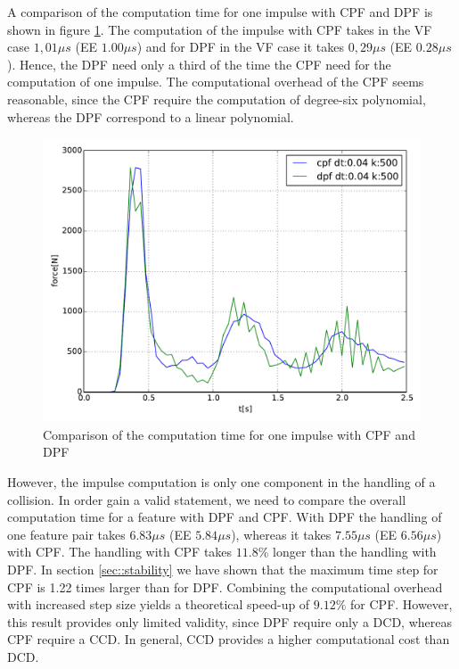 A comparison of the computation time for one impulse with CPF and DPF is shown in figure \ref{fig::comparison_comptime_cpf_dpf_imp}.
The computation of the impulse with CPF takes in the VF case $1,01 \mu s$ (EE $1.00 \mu s$) and for DPF in the VF case it takes $0,29 \mu s$ (EE $0.28 \mu s$). Hence, the DPF need only a third of the time the CPF need for the computation of one impulse. The computational overhead of the CPF seems reasonable, since the CPF require the computation of degree-six polynomial, whereas the DPF correspond to a linear polynomial.
\begin{figure}[tbp]
		\centering
			       \includegraphics[width=0.9\linewidth]{pics/pdf/comparison_comptime_cpf_dpf_imp.pdf} 
	
\caption{Comparison of the computation time for one impulse with CPF and DPF}
\label{fig::comparison_comptime_cpf_dpf_imp}
\end{figure}
However, the impulse computation is only one component in the handling of a collision. In order gain a valid statement, we need to compare the overall computation time for a feature with DPF and CPF. With DPF the handling of one feature pair takes $6.83 \mu s$ (EE $5.84 \mu s$), whereas it takes $7.55 \mu s$ (EE $6.56 \mu s$) with CPF. The handling with CPF takes $11.8\%$ longer than the handling with DPF.
In section \ref{sec::stability} we have shown that the maximum time step for CPF is 1.22 times larger than for DPF. Combining the computational overhead with increased step size yields a theoretical speed-up of $9.12 \%$ for CPF. However, this result provides only limited validity, since DPF require only a DCD, whereas CPF require a CCD. In general, CCD provides a higher computational cost than DCD.

